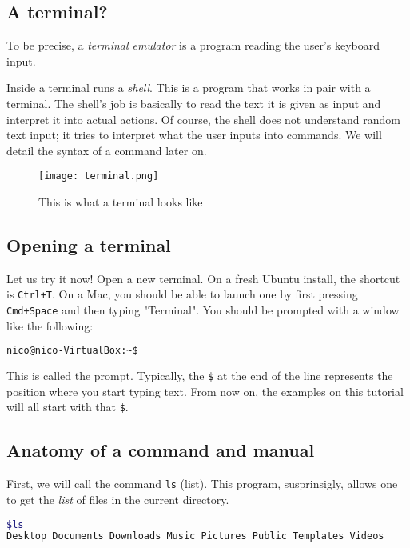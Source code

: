 \documentclass[12pt]{article}
\begin{document}
\subsection{A terminal?}

To be precise, a \textit{terminal emulator} is a program reading the user's keyboard input.

Inside a terminal runs a \textit{shell}. This is a program that works in pair with a terminal. The shell's job is basically to read the text it is given as input and interpret it into actual actions.
Of course, the shell does not understand random text input; it tries to interpret what the user inputs into commands.
We will detail the syntax of a command later on.

\begin{figure}[!h]\centering\captionsetup{}
   \texttt{[image: terminal.png]}
   \caption{This is what a terminal looks like}
\end{figure}

\subsection{Opening a terminal}

Let us try it now! Open a new terminal. On a fresh Ubuntu install, the shortcut is \texttt{Ctrl+T}. On a Mac, you should be able to launch one by first pressing \texttt{Cmd+Space} and then typing "Terminal".
You should be prompted with a window like the following:

\begin{lstlisting}[language=bash]
nico@nico-VirtualBox:~$
\end{lstlisting}

This is called the prompt. Typically, the \texttt{\$} at the end of the line represents the position where you start typing text.
From now on, the examples on this tutorial will all start with that \texttt{\$}.

\subsection{Anatomy of a command and manual}

First, we will call the command \texttt{ls} (list). This program, susprinsigly, allows one to get the \textit{list} of files in the current directory.

\begin{lstlisting}[language=bash]
$ls
Desktop Documents Downloads Music Pictures Public Templates Videos
\end{lstlisting}
\end{document}
